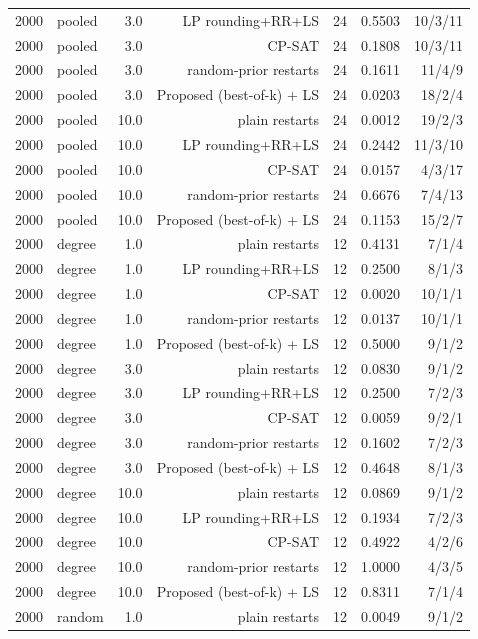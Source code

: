 \begin{table}[t]
\begin{tabular}{llrrrrr}
2000 & pooled & 3.0 & LP rounding+RR+LS & 24 & 0.5503 & 10/3/11 \\
2000 & pooled & 3.0 & CP-SAT & 24 & 0.1808 & 10/3/11 \\
2000 & pooled & 3.0 & random-prior restarts & 24 & 0.1611 & 11/4/9 \\
2000 & pooled & 3.0 & Proposed (best-of-k) + LS & 24 & 0.0203 & 18/2/4 \\
2000 & pooled & 10.0 & plain restarts & 24 & 0.0012 & 19/2/3 \\
2000 & pooled & 10.0 & LP rounding+RR+LS & 24 & 0.2442 & 11/3/10 \\
2000 & pooled & 10.0 & CP-SAT & 24 & 0.0157 & 4/3/17 \\
2000 & pooled & 10.0 & random-prior restarts & 24 & 0.6676 & 7/4/13 \\
2000 & pooled & 10.0 & Proposed (best-of-k) + LS & 24 & 0.1153 & 15/2/7 \\
2000 & degree & 1.0 & plain restarts & 12 & 0.4131 & 7/1/4 \\
2000 & degree & 1.0 & LP rounding+RR+LS & 12 & 0.2500 & 8/1/3 \\
2000 & degree & 1.0 & CP-SAT & 12 & 0.0020 & 10/1/1 \\
2000 & degree & 1.0 & random-prior restarts & 12 & 0.0137 & 10/1/1 \\
2000 & degree & 1.0 & Proposed (best-of-k) + LS & 12 & 0.5000 & 9/1/2 \\
2000 & degree & 3.0 & plain restarts & 12 & 0.0830 & 9/1/2 \\
2000 & degree & 3.0 & LP rounding+RR+LS & 12 & 0.2500 & 7/2/3 \\
2000 & degree & 3.0 & CP-SAT & 12 & 0.0059 & 9/2/1 \\
2000 & degree & 3.0 & random-prior restarts & 12 & 0.1602 & 7/2/3 \\
2000 & degree & 3.0 & Proposed (best-of-k) + LS & 12 & 0.4648 & 8/1/3 \\
2000 & degree & 10.0 & plain restarts & 12 & 0.0869 & 9/1/2 \\
2000 & degree & 10.0 & LP rounding+RR+LS & 12 & 0.1934 & 7/2/3 \\
2000 & degree & 10.0 & CP-SAT & 12 & 0.4922 & 4/2/6 \\
2000 & degree & 10.0 & random-prior restarts & 12 & 1.0000 & 4/3/5 \\
2000 & degree & 10.0 & Proposed (best-of-k) + LS & 12 & 0.8311 & 7/1/4 \\
2000 & random & 1.0 & plain restarts & 12 & 0.0049 & 9/1/2 \\

\end{tabular}
\end{table}

